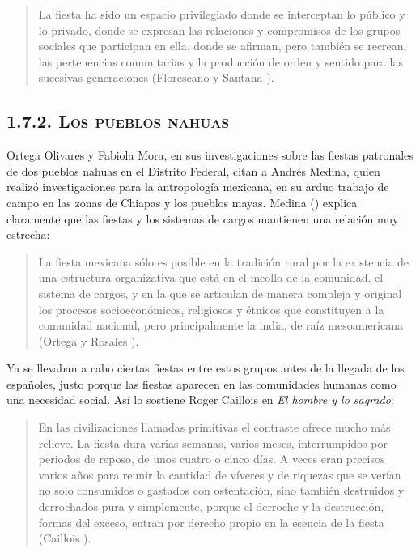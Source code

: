 \documentclass[14pt,letterpaper,twoside]{extbook} %
\begin{document}
\begin{quotation}
\noindent La fiesta ha sido un espacio privilegiado donde se interceptan lo público y lo privado, donde se expresan las relaciones y compromisos de los grupos sociales que participan en ella, donde se afirman, pero también se recrean, las pertenencias comunitarias y la producción de orden y sentido para las sucesivas generaciones (Florescano y Santana ).
\end{quotation}

\subsection*{\mdseries\large\textsc{1.7.2. Los pueblos nahuas}}

\noindent Ortega Olivares y Fabiola Mora, en sus investigaciones sobre las fiestas patronales de dos pueblos nahuas en el Distrito Federal, citan a Andrés Medina, quien realizó investigaciones para la antropología mexicana, en su arduo trabajo de campo en las zonas de Chiapas y los pueblos mayas. Medina () explica claramente que las fiestas y los sistemas de cargos mantienen una relación muy estrecha:

\begin{quotation}
\noindent La fiesta mexicana sólo es posible en la tradición rural por la existencia de una estructura organizativa que está en el meollo de la comunidad, el sistema de cargos, y en la que se articulan de manera compleja y original los procesos socioeconómicos, religiosos y étnicos que constituyen a la comunidad nacional, pero principalmente la india, de raíz mesoamericana (Ortega y Rosales ).
\end{quotation}

\noindent Ya se llevaban a cabo ciertas fiestas entre estos grupos antes de la llegada de los españoles, justo porque las fiestas aparecen en las comunidades humanas como una necesidad social. Así lo sostiene Roger Caillois en \textit{El hombre y lo sagrado}:

\begin{quotation}
\noindent En las civilizaciones llamadas primitivas el contraste ofrece mucho más relieve. La fiesta dura varias semanas, varios meses, interrumpidos por periodos de reposo, de unos cuatro o cinco días. A veces eran precisos varios años para reunir la cantidad de víveres y de riquezas que se verían no solo consumidos o gastados con ostentación, sino también destruidos y derrochados pura y simplemente, porque el derroche y la destrucción, formas del exceso, entran por derecho propio en la esencia de la fiesta (Caillois ).
\end{quotation}
\end{document}
